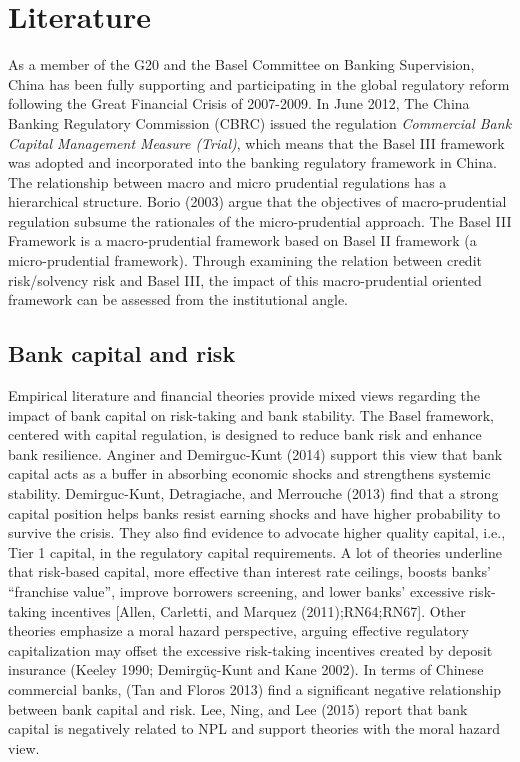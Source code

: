 \documentclass{article}
\begin{document}
\hypertarget{literature}{%
\section{Literature}\label{literature}}

As a member of the G20 and the Basel Committee on Banking Supervision,
China has been fully supporting and participating in the global
regulatory reform following the Great Financial Crisis of 2007-2009. In
June 2012, The China Banking Regulatory Commission (CBRC) issued the
regulation \emph{Commercial Bank Capital Management Measure (Trial)},
which means that the Basel III framework was adopted and incorporated
into the banking regulatory framework in China. The relationship between
macro and micro prudential regulations has a hierarchical structure.
Borio (2003) argue that the objectives of macro-prudential regulation
subsume the rationales of the micro-prudential approach. The Basel III
Framework is a macro-prudential framework based on Basel II framework (a
micro-prudential framework). Through examining the relation between
credit risk/solvency risk and Basel III, the impact of this
macro-prudential oriented framework can be assessed from the
institutional angle.

\hypertarget{bank-capital-and-risk}{%
\subsection{Bank capital and risk}\label{bank-capital-and-risk}}

Empirical literature and financial theories provide mixed views
regarding the impact of bank capital on risk-taking and bank stability.
The Basel framework, centered with capital regulation, is designed to
reduce bank risk and enhance bank resilience. Anginer and Demirguc-Kunt
(2014) support this view that bank capital acts as a buffer in absorbing
economic shocks and strengthens systemic stability. Demirguc-Kunt,
Detragiache, and Merrouche (2013) find that a strong capital position
helps banks resist earning shocks and have higher probability to survive
the crisis. They also find evidence to advocate higher quality capital,
i.e., Tier 1 capital, in the regulatory capital requirements. A lot of
theories underline that risk-based capital, more effective than interest
rate ceilings, boosts banks' ``franchise value'', improve borrowers
screening, and lower banks' excessive risk-taking incentives {[}Allen,
Carletti, and Marquez (2011);RN64;RN67{]}. Other theories emphasize a
moral hazard perspective, arguing effective regulatory capitalization
may offset the excessive risk-taking incentives created by deposit
insurance (Keeley 1990; Demirgüç-Kunt and Kane 2002). In terms of
Chinese commercial banks, (Tan and Floros 2013) find a significant
negative relationship between bank capital and risk. Lee, Ning, and Lee
(2015) report that bank capital is negatively related to NPL and support
theories with the moral hazard view.
\end{document}
